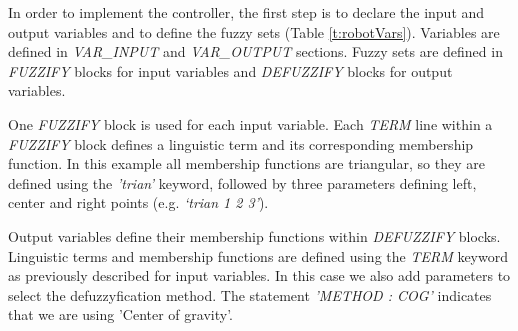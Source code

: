 \documentclass[conference]{IEEEtran}
\begin{document}
In order to implement the controller, the first step is to declare the input and output variables and to define the fuzzy sets (Table \ref{t:robotVars}).
Variables are defined in \textit{VAR\_INPUT} and \textit{VAR\_OUTPUT} sections.
Fuzzy sets are defined in \textit{FUZZIFY} blocks for input variables and \textit{DEFUZZIFY} blocks for output variables.

One \textit{FUZZIFY} block is used for each input variable.
Each \textit{TERM} line within a \textit{FUZZIFY} block defines a linguistic term and its corresponding membership function. 
In this example all membership functions are triangular, so they are defined using the \textit{'trian'} keyword, followed by three parameters defining left, center and right points (e.g. \textit{`trian 1 2 3'}).

Output variables define their membership functions within \textit{DEFUZZIFY} blocks.
Linguistic terms and membership functions are defined using the \textit{TERM} keyword as previously described for input variables.
In this case we also add parameters to select the defuzzyfication method. 
The statement \textit{'METHOD : COG'} indicates that we are using 'Center of gravity'.
\end{document}
